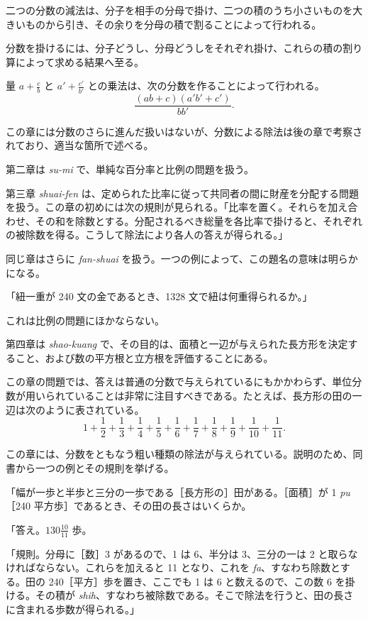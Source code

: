 \documentclass[11pt]{article}
\newcommand{\scanpage}[2]{\clearpage\setcounter{footnote}{0}\noindent{\footnotesize\color{gray}PDF #1 頁 · #2}\par\medskip}
\newcommand{\scanfooter}{}
\begin{document}
二つの分数の減法は、分子を相手の分母で掛け、二つの積のうち小さいものを大きいものから引き、その余りを分母の積で割ることによって行われる。

分数を掛けるには、分子どうし、分母どうしをそれぞれ掛け、これらの積の割り算によって求める結果へ至る。

量 $a+\frac cb$ と $a'+\frac{c'}{b'}$ との乗法は、次の分数を作ることによって行われる。
\[
\frac{(ab+c)(a'b'+c')}{bb'}.
\]

この章には分数のさらに進んだ扱いはないが、分数による除法は後の章で考察されており、適当な箇所で述べる。

第二章は \emph{su-mi} で、単純な百分率と比例の問題を扱う。
\scanfooter

\scanpage{0026}{第三章、印刷頁12}
第三章 \emph{shuai-fen} は、定められた比率に従って共同者の間に財産を分配する問題を扱う。この章の初めには次の規則が見られる。「比率を置く。それらを加え合わせ、その和を除数とする。分配されるべき総量を各比率で掛けると、それぞれの被除数を得る。こうして除法により各人の答えが得られる。」

同じ章はさらに \emph{fan-shuai} を扱う。一つの例によって、この題名の意味は明らかになる。

「紐一重が 240 文の金であるとき、1328 文で紐は何重得られるか。」

これは比例の問題にほかならない。

第四章は \emph{shao-kuang} で、その目的は、面積と一辺が与えられた長方形を決定すること、および数の平方根と立方根を評価することにある。

この章の問題では、答えは普通の分数で与えられているにもかかわらず、単位分数が用いられていることは非常に注目すべきである。たとえば、長方形の田の一辺は次のように表されている。
\[
1+\frac12+\frac13+\frac14+\frac15+\frac16+\frac17+\frac18+\frac19+\frac1{10}+\frac1{11}.
\]

この章には、分数をともなう粗い種類の除法が与えられている。説明のため、同書から一つの例とその規則を挙げる。

「幅が一歩と半歩と三分の一歩である［長方形の］田がある。［面積］が 1 \emph{pu}［240 平方歩］であるとき、その田の長さはいくらか。

「答え。$130\frac{10}{11}$ 歩。

「規則。分母に［数］3 があるので、1 は 6、半分は 3、三分の一は 2 と取らなければならない。これらを加えると 11 となり、これを \emph{fa}、すなわち除数とする。田の 240［平方］歩を置き、ここでも 1 は 6 と数えるので、この数 6 を掛ける。その積が \emph{shih}、すなわち被除数である。そこで除法を行うと、田の長さに含まれる歩数が得られる。」
\end{document}
